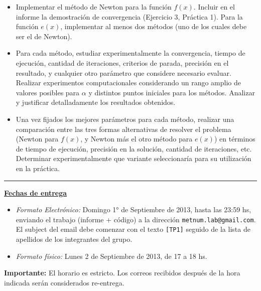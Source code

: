 \begin{itemize}
\item Implementar el m\'etodo de Newton para la funci\'on $f(x)$. Incluir en el informe la demostraci\'on de
convergencia (Ejercicio 3, Pr\'actica 1). Para la funci\'on $e(x)$, implementar al menos dos m\'etodos (uno de los
cuales debe ser el de Newton).   
\item Para cada m\'etodo, estudiar experimentalmente la convergencia, tiempo de ejecuci\'on, cantidad de iteraciones,
criterios de parada, precisi\'on en el resultado, y cualquier otro par\'ametro que considere necesario evaluar. Realizar experimentos
computacionales considerando un rango amplio de valores posibles para $\alpha$ y distintos puntos iniciales
para los m\'etodos. Analizar y justificar detalladamente los resultados obtenidos.
\item Una vez fijados los mejores par\'ametros para cada m\'etodo, realizar una comparaci\'on entre las tres formas
alternativas de resolver el problema (Newton para $f(x)$, y Newton m\'as el otro m\'etodo para $e(x)$) en t\'erminos de
tiempo de ejecuci\'on, precisi\'on en la soluci\'on, cantidad de iteraciones, etc. Determinar experimentalmente que
variante seleccionar\'ia para su utilizaci\'on en la pr\'actica.
\end{itemize}

\vskip 15pt

\hrule

\vskip 11pt


{\bf \underline{Fechas de entrega}}
\begin{itemize}
 \item \emph{Formato Electr\'onico:} Domingo 1° de Septiembre de 2013, hasta las 23:59 hs, enviando el trabajo (informe +
 c\'odigo) a la direcci\'on \verb+metnum.lab@gmail.com+. El subject del email debe comenzar con el texto \verb+[TP1]+
 seguido de la lista de apellidos  de los integrantes del grupo.
 \item \emph{Formato f\'isico:} Lunes 2 de Septiembre de 2013, de 17 a 18 hs.
\end{itemize}

\noindent \textbf{Importante:} El horario es estricto. Los correos recibidos despu\'es de la hora indicada ser\'an considerados re-entrega.